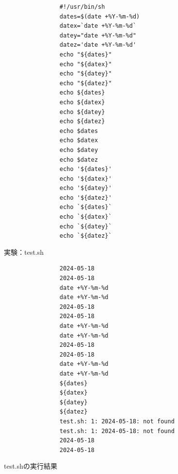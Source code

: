 \documentclass[12pt,a4paper,uplatex]{jsbook}
\begin{document}
\begin{itemize}
	\begin{figure}[htbp]
		\begin{minipage}[b]{0.45\linewidth}
			\centering
			\begin{verbatim}
				#!/usr/bin/sh
				dates=$(date +%Y-%m-%d)
				datex=`date +%Y-%m-%d`
				datey="date +%Y-%m-%d"
				datez='date +%Y-%m-%d'
				echo "${dates}"
				echo "${datex}"
				echo "${datey}"
				echo "${datez}"
				echo ${dates}
				echo ${datex}
				echo ${datey}
				echo ${datez}
				echo $dates
				echo $datex
				echo $datey
				echo $datez
				echo '${dates}'
				echo '${datex}'
				echo '${datey}'
				echo '${datez}'
				echo `${dates}`
				echo `${datex}`
				echo `${datey}`
				echo `${datez}`
			\end{verbatim}			
			\caption{実験：test.sh}
		\end{minipage}
		\hspace{1.0cm}
		\begin{minipage}[b]{0.45\linewidth}
			\centering
			\begin{verbatim}
				2024-05-18
				2024-05-18
				date +%Y-%m-%d
				date +%Y-%m-%d
				2024-05-18
				2024-05-18
				date +%Y-%m-%d
				date +%Y-%m-%d
				2024-05-18
				2024-05-18
				date +%Y-%m-%d
				date +%Y-%m-%d
				${dates}
				${datex}
				${datey}
				${datez}
				test.sh: 1: 2024-05-18: not found
				test.sh: 1: 2024-05-18: not found
				2024-05-18
				2024-05-18
			\end{verbatim}		
			\caption{test.shの実行結果}
		\end{minipage}
	\end{figure}
	

\end{itemize}
\end{document}
